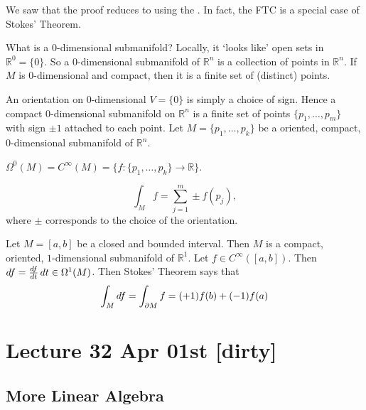 \documentclass[notoc,notitlepage]{tufte-book}
\begin{document}
\begin{remark}
  We saw that the proof reduces to using the . In fact, the FTC is a special case of Stokes' Theorem.

  What is a $0$-dimensional submanifold? Locally, it `looks like' open sets in
  $\mathbb{R}^0 = \{0\}$. So a $0$-dimensional submanifold of $\mathbb{R}^n$ is a
  collection of points in $\mathbb{R}^n$. If $M$ is $0$-dimensional and compact,
  then it is a finite set of (distinct) points.

  An orientation on $0$-dimensional $V = \{0\}$ is simply a choice of sign.
  Hence a compact $0$-dimensional submanifold on $\mathbb{R}^n$ is a finite set
  of points $\{p_1, \ldots, p_m \}$ with sign $\pm 1$ attached to each point.
  Let $M = \{p_1, \ldots, p_k\}$ be a oriented, compact, $0$-dimensional
  submanifold of $\mathbb{R}^n$.

  $\Omega^0(M) = C^\infty(M) = \{ f : \{p_1, \ldots, p_k\} \to \mathbb{R} \}$.

  \begin{equation*}
    \int_{M} f = \sum_{j=1}^{m} \pm f(p_j),
  \end{equation*}
  where $\pm$ corresponds to the choice of the orientation.

  Let $M = [a, b]$ be a closed and bounded interval. Then $M$ is a compact,
  oriented, $1$-dimensional submanifold of $\mathbb{R}^1$. Let $f \in
  C^\infty([a, b])$. Then $\mathop{}\!d{f} = \frac{\mathop{}\!d{f}}{\mathop{}\!d{t}} \mathop{}\!d{t} \in
  \Omega^1(M)$. Then Stokes' Theorem says that
  \begin{equation*}
    \int_{M} \mathop{}\!d{f} = \int_{\partial M} f = (+1) f(b) + (-1) f(a)
  \end{equation*}
\end{remark}



\label{part:differential_geometry}

\chapter{Lecture 32 Apr 01st [dirty]}%
\label{chp:lecture_32_apr_01st}

\section{More Linear Algebra}%
\label{sec:more_linear_algebra}
\end{document}
